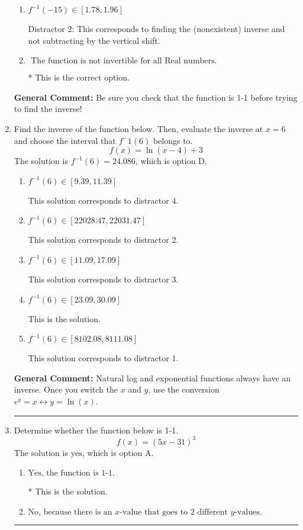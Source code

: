 \documentclass{extbook}[14pt]
\newcommand{\litem}[1]{\item #1

\rule{\textwidth}{0.4pt}}
\begin{document}
\begin{enumerate}
{\begin{enumerate}[label=\Alph*.]
 Distractor 1: This corresponds to trying to find the inverse even though the function is not 1-1. 
\item \( f^{-1}(-15) \in [1.78, 1.96] \)

 Distractor 2: This corresponds to finding the (nonexistent) inverse and not subtracting by the vertical shift.
\item \( \text{ The function is not invertible for all Real numbers. } \)

* This is the correct option.
\end{enumerate}

\textbf{General Comment:} Be sure you check that the function is 1-1 before trying to find the inverse!
}
\litem{
Find the inverse of the function below. Then, evaluate the inverse at $x = 6$ and choose the interval that $f^-1(6)$ belongs to.
\[ f(x) = \ln{(x-4)}+3 \]The solution is \( f^{-1}(6) = 24.086 \), which is option D.\begin{enumerate}[label=\Alph*.]
\item \( f^{-1}(6) \in [9.39, 11.39] \)

 This solution corresponds to distractor 4.
\item \( f^{-1}(6) \in [22028.47, 22031.47] \)

 This solution corresponds to distractor 2.
\item \( f^{-1}(6) \in [11.09, 17.09] \)

 This solution corresponds to distractor 3.
\item \( f^{-1}(6) \in [23.09, 30.09] \)

 This is the solution.
\item \( f^{-1}(6) \in [8102.08, 8111.08] \)

 This solution corresponds to distractor 1.
\end{enumerate}

\textbf{General Comment:} Natural log and exponential functions always have an inverse. Once you switch the $x$ and $y$, use the conversion $ e^y = x \leftrightarrow y=\ln(x)$.
}
\litem{
Determine whether the function below is 1-1.
\[ f(x) = (5 x - 31)^3 \]The solution is \( \text{yes} \), which is option A.\begin{enumerate}[label=\Alph*.]
\item \( \text{Yes, the function is 1-1.} \)

* This is the solution.
\item \( \text{No, because there is an $x$-value that goes to 2 different $y$-values.} \)


\end{enumerate}}
\end{enumerate}
\end{document}
